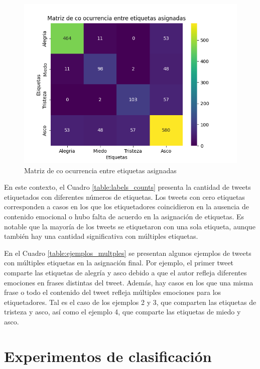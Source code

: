 \begin{figure}[!htbp]
	\centering
	\includegraphics[scale=0.75]{Images & Logos/Results/Matriz_confusion_labels.png}
	\caption{Matriz de co ocurrencia entre etiquetas asignadas}
	\label{figure:Matriz_etiquetas}
\end{figure}

En este contexto, el Cuadro \ref{table:labels_counts} presenta la cantidad de tweets etiquetados con diferentes números de etiquetas. Los tweets con cero etiquetas corresponden a casos en los que los etiquetadores coincidieron en la ausencia de contenido emocional o hubo falta de acuerdo en la asignación de etiquetas. Es notable que la mayoría de los tweets se etiquetaron con una sola etiqueta, aunque también hay una cantidad significativa con múltiples etiquetas.



En el Cuadro \ref{table:ejemplos_multples} se presentan algunos ejemplos de tweets con múltiples etiquetas en la asignación final. Por ejemplo, el primer tweet comparte las etiquetas de alegría y asco debido a que el autor refleja diferentes emociones en frases distintas del tweet. Además, hay casos en los que una misma frase o todo el contenido del tweet refleja múltiples emociones para los etiquetadores. Tal es el caso de los ejemplos 2 y 3, que comparten las etiquetas de tristeza y asco, así como el ejemplo 4, que comparte las etiquetas de miedo y asco.

\scriptsize

\normalsize


\section{Experimentos de clasificación}




